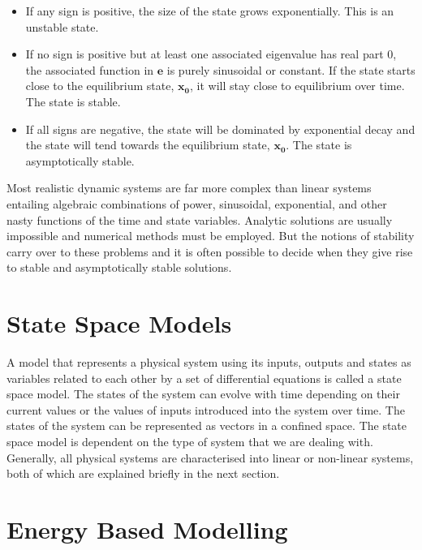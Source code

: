 \documentclass{UoNMCHA}
\numberwithin{equation}{section}
\begin{document}
	\begin{itemize}
		\item	If any sign is positive, the size of the state grows exponentially. This is an unstable state.
		
		\item	If no sign is positive but at least one associated eigenvalue has real part 0, the associated function in $\mathbf{e}$ is purely sinusoidal or constant. If the state starts close to the equilibrium state, $\mathbf{x}_\mathbf{0}$, it will stay close to equilibrium over time. The state is stable.
		
		\item	If all signs are negative, the state will be dominated by exponential decay and the state will tend towards the equilibrium state, $\mathbf{x}_\mathbf{0}$. The state is asymptotically stable.
	\end{itemize}
	
	Most realistic dynamic systems are far more complex than linear systems entailing algebraic combinations of power, sinusoidal, exponential, and other nasty functions of the time and state variables. Analytic solutions are usually impossible and numerical methods must be employed. But the notions of stability carry over to these problems and it is often possible to decide when they give rise to stable and asymptotically stable solutions.
	
	\section{State Space Models}\label{State Space Models}
	A model that represents a physical system using its inputs, outputs and states as variables related to each other by a set of differential equations is called a state space model. The states of the system can evolve with time depending on their current values or the values of inputs introduced into the system over time. The states of the system can be represented as vectors in a confined space. The state space model is dependent on the type of system that we are dealing with. Generally, all physical systems are characterised into linear or non-linear systems, both of which are explained briefly in the next section.
	
	
	\section{Energy Based Modelling}\label{Energy Based Modelling}
	
\end{document}

